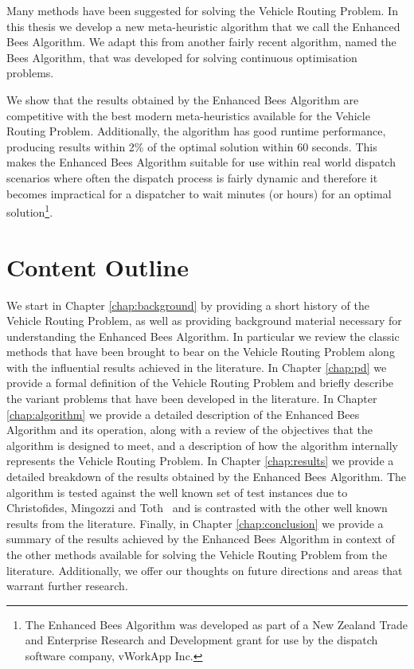 Many methods have been suggested for solving the Vehicle Routing Problem. In this thesis we develop a new meta-heuristic algorithm that we call the Enhanced Bees Algorithm. We adapt this from another fairly recent algorithm, named the Bees Algorithm, that was developed for solving continuous optimisation problems.

We show that the results obtained by the Enhanced Bees Algorithm are competitive with the best modern meta-heuristics available for the Vehicle Routing Problem. Additionally, the algorithm has good runtime performance, producing results within 2\% of the optimal solution within 60 seconds. This makes the Enhanced Bees Algorithm suitable for use within real world dispatch scenarios where often the dispatch process is fairly dynamic and therefore it becomes impractical for a dispatcher to wait minutes (or hours) for an optimal solution\footnote{The Enhanced Bees Algorithm was developed as part of a New Zealand Trade and Enterprise Research and Development grant for use by the dispatch software company, vWorkApp Inc.}.

\section{Content Outline}

We start in Chapter \ref{chap:background} by providing a short history of the Vehicle Routing Problem, as well as providing background material necessary for understanding the Enhanced Bees Algorithm. In particular we review the classic methods that have been brought to bear on the Vehicle Routing Problem along with the influential results achieved in the literature. In Chapter \ref{chap:pd} we provide a formal definition of the Vehicle Routing Problem and briefly describe the variant problems that have been developed in the literature. In Chapter \ref{chap:algorithm} we provide a detailed description of the Enhanced Bees Algorithm and its operation, along with a review of the objectives that the algorithm is designed to meet, and a description of how the algorithm internally represents the Vehicle Routing Problem. In Chapter \ref{chap:results} we provide a detailed breakdown of the results obtained by the Enhanced Bees Algorithm. The algorithm is tested against the well known set of test instances due to Christofides, Mingozzi and Toth~\cite{CMT:1981} and is contrasted with the other well known results from the literature. Finally, in Chapter \ref{chap:conclusion} we provide a summary of the results achieved by the Enhanced Bees Algorithm in context of the other methods available for solving the Vehicle Routing Problem from the literature. Additionally, we offer our thoughts on future directions and areas that warrant further research.  




 

